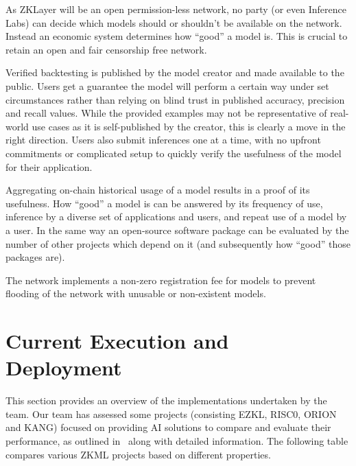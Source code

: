 \documentclass[conference]{IEEEtran}
\begin{document}
As ZKLayer will be an open permission-less network, no party (or even Inference Labs) can decide which models should or shouldn’t be available on the network. Instead an economic system determines how “good” a model is. This is crucial to retain an open and fair censorship free network.

Verified backtesting is published by the model creator and made available to the public. Users get a guarantee the model will perform a certain way under set circumstances rather than relying on blind trust in published accuracy, precision and recall values. While the provided examples may not be representative of real-world use cases as it is self-published by the creator, this is clearly a move in the right direction. Users also submit inferences one at a time, with no upfront commitments or complicated setup to quickly verify the usefulness of the model for their application.

Aggregating on-chain historical usage of a model results in a proof of its usefulness. How “good” a model is can be answered by its frequency of use, inference by a diverse set of applications and users, and repeat use of a model by a user. In the same way an open-source software package can be evaluated by the number of other projects which depend on it (and subsequently how “good” those packages are).

The network implements a non-zero registration fee for models to prevent flooding of the network with unusable or non-existent models.


\section{Current Execution and Deployment}

This section provides an overview of the implementations undertaken by the team. Our team has assessed some projects (consisting EZKL, RISC0, ORION and KANG) focused on providing AI solutions to compare and evaluate their performance, as outlined in~\cite{BrainbenchXYZ} along with detailed information. The following table compares various ZKML projects based on different properties.
\end{document}
